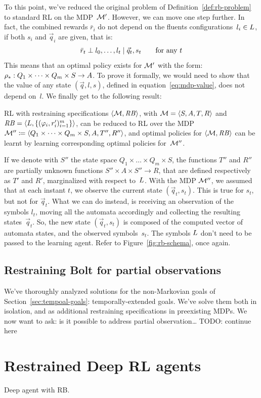 To this point, we've reduced the original problem of
Definition~\ref{def:rb-problem} to standard RL on the MDP~$\mathcal{M}'$. However,
we can move one step further. In fact, the combined rewards $\bar{r}_i$ do not
depend on the fluents configurations~$l_i \in L$, if both $s_i$
and $\vec{q}_i$ are given, that is:
\[
	\bar{r}_t \perp l_0, \dots, l_t \mid \vec{q}_t, s_t \qquad
	\text{for any $t$}
\]
This means that an optimal policy exists for $\mathcal{M}'$ with the form:
${\rho}_*: Q_1 \times \dots \times Q_m \times S \to A$.
To prove it formally, we would need to show that the value of any state
$(\vec{q}, l, s)$, defined in equation~\eqref{eq:mdp-value}, does not depend
on~$l$. We finally get to the following result:
\begin{theorem}
	\cite{bib:bolt} RL with \ldl{} restraining specifications
	$\langle \mathcal{M}, \text{\textit{RB}} \rangle$, with $\mathcal{M} = \langle S, A, T,
	R \rangle$ and $\text{\textit{RB}} = \langle L, \{(\varphi_i,
	r_i')_{i=1}^m\} \rangle$, can be reduced to RL over the MDP $\mathcal{M}'' \coloneqq
	\langle Q_1 \times \dots \times Q_m \times S, A, T'', R''\rangle$,
	and optimal policies for $\langle \mathcal{M}, \text{\textit{RB}} \rangle$ can be learnt
	by learning corresponding optimal policies for~$\mathcal{M}''$.
\end{theorem}
If we denote with $S''$ the state space $Q_1 \times \dots \times Q_m \times
S$, the functions $T''$ and $R''$ are partially unknown functions $S'' \times
A \times S'' \to R$, that are defined respectively as $T'$ and $R'$,
marginalized with respect to~$L$. With the MDP $\mathcal{M}''$, we assumed
that at each instant $t$, we observe the current state $(\vec{q}_t, s_t)$.
This is true for $s_t$, but not for $\vec{q}_t$. What we can do instead, is
receiving an observation of the symbols $l_t$, moving all the automata
accordingly and collecting the resulting states~$\vec{q}_t$. So, the new
state $(\vec{q}_t, s_t)$ is composed of the computed vector of automata
states, and the observed symbols~$s_t$. The symbols $L$ don't need
to be passed to the learning agent. Refer to Figure~\ref{fig:rb-schema}, once
again.


\subsection{Restraining Bolt for partial observations}

We've thoroughly analyzed solutions for the non-Markovian goals of
Section~\ref{sec:tempoal-goals}: temporally-extended goals. We've solve them
both in isolation, and as additional restraining specifications in preexisting
MDPs. We now want to ask: is it possible to address partial observation\dots
TODO: continue here





\section{Restrained Deep RL agents}

\label{sec:rb-deep-model}

Deep agent with RB.

